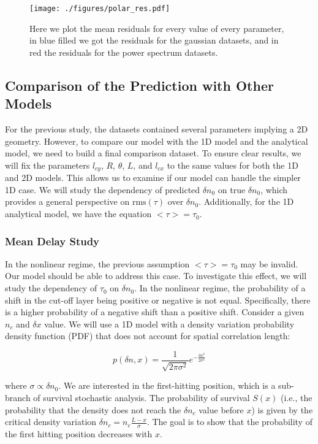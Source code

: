 \documentclass[11pt,openany]{report}
\begin{document}
\begin{figure}[H]
    \centering
    \texttt{[image: ./figures/polar\_res.pdf]}
    \caption{Here we plot the mean residuals for every value of every parameter, in blue filled we got the residuals for the gaussian datasets, and in red the residuals for the power spectrum datasets. }
\end{figure}
\newpage
\begin{multicols}{2}

    \subsection{Comparison of the Prediction with Other Models}

    For the previous study, the datasets contained several parameters implying a 2D geometry. However, to compare our model with the 1D model and the analytical model, we need to build a final comparison dataset. To ensure clear results, we will fix the parameters $l_{cy}$, $R$, $\theta$, $L$, and $l_{cx}$ to the same values for both the 1D and 2D models. This allows us to examine if our model can handle the simpler 1D case. We will study the dependency of predicted $\delta n_0$ on true $\delta n_0$, which provides a general perspective on $\text{rms}(\tau)$ over $\delta n_0$. Additionally, for the 1D analytical model, we have the equation $< \tau > = \tau_0$.

    \subsubsection{Mean Delay Study}

    In the nonlinear regime, the previous assumption $< \tau > = \tau_0$ may be invalid. Our model should be able to address this case. To investigate this effect, we will study the dependency of $\tau_0$ on $\delta n_0$. In the nonlinear regime, the probability of a shift in the cut-off layer being positive or negative is not equal. Specifically, there is a higher probability of a negative shift than a positive shift. Consider a given $n_c$ and $\delta x$ value. We will use a 1D model with a density variation probability density function (PDF) that does not account for spatial correlation length:

    $$
        p(\delta n, x) = \frac{1}{\sqrt{2 \pi \sigma^2}} e^{-\frac{\delta n^2}{2\sigma^2}}
    $$

    where $\sigma \propto \delta n_0$. We are interested in the first-hitting position, which is a sub-branch of survival stochastic analysis. The probability of survival $S(x)$ (i.e., the probability that the density does not reach the $\delta n_c$ value before $x$) is given by the critical density variation $\delta n_c = n_c \frac{L - x}{\sigma}$. The goal is to show that the probability of the first hitting position decreases with $x$.


\end{multicols}
\end{document}
